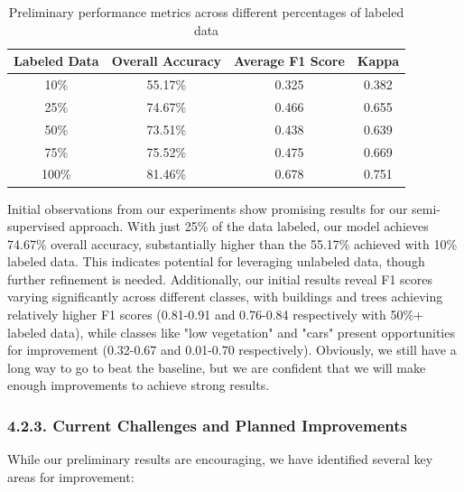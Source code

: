 \documentclass[conference]{IEEEtran}
\begin{document}
\begin{table}[h]
\centering
\begin{tabular}{|c|c|c|c|}
\hline
\textbf{Labeled Data} & \textbf{Overall Accuracy} & \textbf{Average F1 Score} & \textbf{Kappa} \\
\hline
10\% & 55.17\% & 0.325 & 0.382 \\
25\% & 74.67\% & 0.466 & 0.655 \\
50\% & 73.51\% & 0.438 & 0.639 \\
75\% & 75.52\% & 0.475 & 0.669 \\
100\% & 81.46\% & 0.678 & 0.751 \\
\hline
\end{tabular}
\caption{Preliminary performance metrics across different percentages of labeled data}
\end{table}
Initial observations from our experiments show promising results for our semi-supervised approach. With just 25\% of the data labeled, our model achieves 74.67\% overall accuracy, substantially higher than the 55.17\% achieved with 10\% labeled data. This indicates potential for leveraging unlabeled data, though further refinement is needed. Additionally, our initial results reveal F1 scores varying significantly across different classes, with buildings and trees achieving relatively higher F1 scores (0.81-0.91 and 0.76-0.84 respectively with 50\%+ labeled data), while classes like "low vegetation" and "cars" present opportunities for improvement (0.32-0.67 and 0.01-0.70 respectively). Obviously, we still have a long way to go to beat the baseline, but we are confident that we will make enough improvements to achieve strong results.

\subsubsection*{4.2.3. Current Challenges and Planned Improvements}

While our preliminary results are encouraging, we have identified several key areas for improvement:
\end{document}
